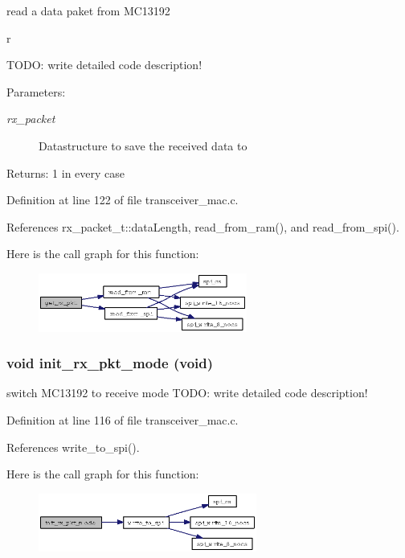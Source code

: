 read a data paket from MC13192 

r

TODO: write detailed code description! \begin{Desc}
\item[Parameters:]
\begin{description}
\item[{\em rx\_\-packet}]Datastructure to save the received data to \end{description}
\end{Desc}
\begin{Desc}
\item[Returns:]1 in every case \end{Desc}


Definition at line 122 of file transceiver\_\-mac.c.

References rx\_\-packet\_\-t::data\-Length, read\_\-from\_\-ram(), and read\_\-from\_\-spi().

Here is the call graph for this function:\begin{figure}[H]
\begin{center}
\leavevmode
\includegraphics[width=194pt]{group__ro__transceiver__mac_g067cd80bde03341e70769deee8aa8054_cgraph}
\end{center}
\end{figure}
\subsubsection{\setlength{\rightskip}{0pt plus 5cm}void init\_\-rx\_\-pkt\_\-mode (void)}\label{group__ro__transceiver__mac_g0ed60622e56ffb790ac27c0a3aa933ba}


switch MC13192 to receive mode TODO: write detailed code description! 



Definition at line 116 of file transceiver\_\-mac.c.

References write\_\-to\_\-spi().

Here is the call graph for this function:\begin{figure}[H]
\begin{center}
\leavevmode
\includegraphics[width=203pt]{group__ro__transceiver__mac_g0ed60622e56ffb790ac27c0a3aa933ba_cgraph}
\end{center}
\end{figure}
